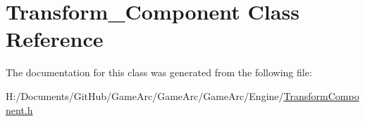 \hypertarget{class_transform___component}{\section{Transform\+\_\+\+Component Class Reference}
\label{class_transform___component}
}


The documentation for this class was generated from the following file\+:\begin{DoxyCompactItemize}
\item 
H\+:/\+Documents/\+Git\+Hub/\+Game\+Arc/\+Game\+Arc/\+Game\+Arc/\+Engine/\hyperlink{_transform_component_8h}{Transform\+Component.\+h}\end{DoxyCompactItemize}
